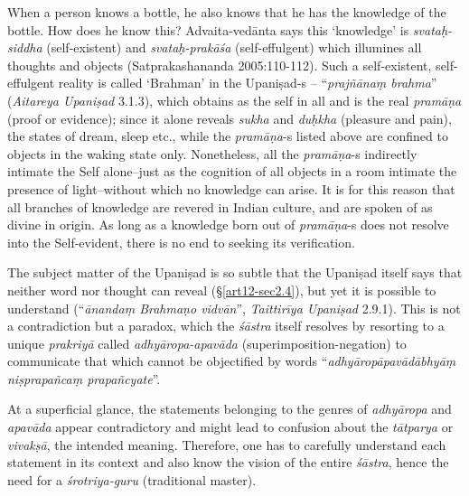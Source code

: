 When a person knows a bottle, he also knows that he has the knowledge of the bottle. How does he know this? Advaita-vedānta says this `knowledge' is {\sl svataḥ-siddha} (self-existent) and {\sl svataḥ-prakāśa} (self-effulgent) which illumines all thoughts and objects (Satprakashananda 2005:110-112). Such a self-existent, self-effulgent reality is called `Brahman' in the Upaniṣad-s -- ``{\sl prajñānaṃ brahma}'' ({\sl Aitareya Upaniṣad} 3.1.3), which obtains as the self in all and is the real {\sl pramāṇa} (proof or evidence); since it alone reveals {\sl sukha} and {\sl duḥkha} (pleasure and pain), the states of dream, sleep etc., while the {\sl pramāṇa}-s listed above are conﬁned to objects in the waking state only. Nonetheless, all the {\sl pramāṇa}-s indirectly intimate the Self alone--just as the cognition of all objects in a room intimate the presence of light--without which no knowledge can arise. It is for this reason that all branches of knowledge are revered in Indian culture, and are spoken of as divine in origin. As long as a knowledge born out of {\sl pra\-mā\-ṇa}-s does not resolve into the Self-evident, there is no end to seeking its veriﬁcation.

The subject matter of the Upaniṣad is so subtle that the Upaniṣad itself says that neither word nor thought can reveal (\S\ref{art12-sec2.4}), but yet it is possible to understand (``{\sl ānandaṃ Brahmaṇo vidvān}'', {\sl Taittirīya Upaniṣad} 2.9.1). This is not a contradiction but a paradox, which the {\sl śāstra} itself resolves by resorting to a unique {\sl prakriyā} called {\sl adhyāropa-apavāda} (superimposition-negation) to communicate that which cannot be objectiﬁed by words ``{\sl adhyāropāpavādābhyāṃ niṣprapañcaṃ prapañcyate}''. 

At a superﬁcial glance, the statements belonging to the genres of {\sl adhyāropa} and {\sl apavāda} appear contradictory and might lead to confusion about the {\sl tātparya} or {\sl vivakṣā}, the intended meaning. Therefore, one has to carefully understand each statement in its context and also know the vision of the entire {\sl śāstra}, hence the need for a {\sl śrotriya-guru} (traditional master).\\[-20pt]

